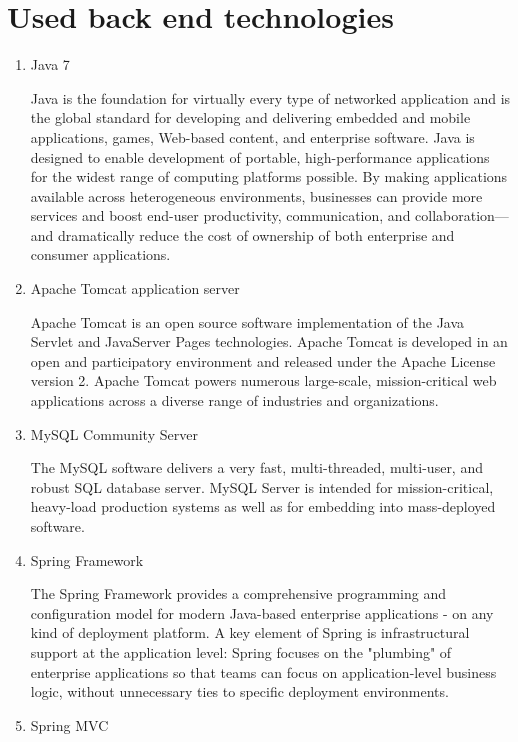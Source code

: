 \documentclass[thesis=B,english]{FITthesis}[2012/10/20]
\begin{document}
\section{Used back end technologies}
\begin{enumerate}

\item{Java 7}

Java is the foundation for virtually every type of networked application and is the global standard for developing and delivering embedded and mobile applications, games, Web-based content, and enterprise software. Java is designed to enable development of portable, high-performance applications for the widest range of computing platforms possible. By making applications available across heterogeneous environments, businesses can provide more services and boost end-user productivity, communication, and collaboration—and dramatically reduce the cost of ownership of both enterprise and consumer applications.\cite{java}

\item{Apache Tomcat application server}

Apache Tomcat is an open source software implementation of the Java Servlet and JavaServer Pages technologies. Apache Tomcat is developed in an open and participatory environment and released under the Apache License version 2. Apache Tomcat powers numerous large-scale, mission-critical web applications across a diverse range of industries and organizations.\cite{apache}

\item{MySQL Community Server}

The MySQL software delivers a very fast, multi-threaded, multi-user, and robust SQL database server. MySQL Server is intended for mission-critical, heavy-load production systems as well as for embedding into mass-deployed software.\cite{mysql}

\item{Spring Framework}

The Spring Framework provides a comprehensive programming and configuration model for modern Java-based enterprise applications - on any kind of deployment platform. A key element of Spring is infrastructural support at the application level: Spring focuses on the "plumbing" of enterprise applications so that teams can focus on application-level business logic, without unnecessary ties to specific deployment environments.\cite{spring}

\item{Spring MVC}


\end{enumerate}
\end{document}
